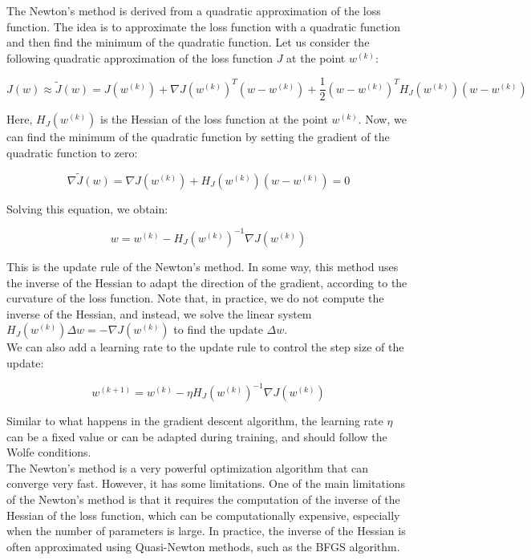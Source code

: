 The Newton's method is derived from a quadratic approximation of the loss function. The idea is to
approximate the loss function with a quadratic function and then find the minimum of the quadratic
function. Let us consider the following quadratic approximation of the loss function $J$ at the point
$w^{(k)}$:

\begin{equation}
    J(w) \approx \tilde{J}(w) = J(w^{(k)}) + \nabla J(w^{(k)})^T (w - w^{(k)}) + \frac{1}{2} (w - w^{(k)})^T H_J(w^{(k)}) (w - w^{(k)})
\end{equation}

Here, $H_J(w^{(k)})$ is the Hessian of the loss function at the point $w^{(k)}$. Now, we can find the
minimum of the quadratic function by setting the gradient of the quadratic function to zero:

$$\nabla \tilde{J}(w) = \nabla J(w^{(k)}) + H_J(w^{(k)}) (w - w^{(k)}) = 0$$

Solving this equation, we obtain:

\begin{equation}
    w = w^{(k)} - H_J(w^{(k)})^{-1} \nabla J(w^{(k)})
\end{equation}

This is the update rule of the Newton's method. In some way, this method uses the inverse of the
Hessian to adapt the direction of the gradient, according to the curvature of the loss function. 
Note that, in practice, we do not compute the inverse of the Hessian, and instead, we solve the
linear system $H_J(w^{(k)}) \Delta w = - \nabla J(w^{(k)})$ to find the update $\Delta w$.\\

We can also add a learning rate to the update rule to control the step size of the update:

\begin{equation}
    w^{(k+1)} = w^{(k)} - \eta H_J(w^{(k)})^{-1} \nabla J(w^{(k)})
\end{equation}

Similar to what happens in the gradient descent algorithm, the learning rate $\eta$ can be a fixed
value or can be adapted during training, and should follow the Wolfe conditions.\\ 

The Newton's method is a very powerful optimization algorithm that can converge very fast. However,
it has some limitations. One of the main limitations of the Newton's method is that it requires the
computation of the inverse of the Hessian of the loss function, which can be computationally expensive,
especially when the number of parameters is large. In practice, the inverse of the Hessian is often 
approximated using Quasi-Newton methods, such as the BFGS algorithm.

